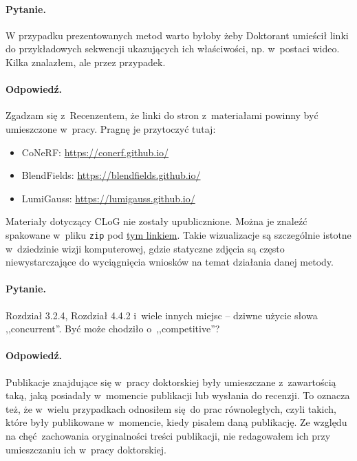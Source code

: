 \documentclass{rebuttal}
\begin{document}
  \responsedelimiter

\paragraph{Pytanie.}
  W przypadku prezentowanych metod warto byłoby żeby Doktorant umieścił linki do
  przykładowych sekwencji ukazujących ich właściwości, np. w~postaci wideo.
  Kilka znalazłem, ale przez przypadek.
\paragraph{Odpowiedź.}
  Zgadzam się z~Recenzentem, że linki do stron z~materiałami powinny być
  umieszczone w~pracy. Pragnę je przytoczyć tutaj:
  \begin{itemize}
    \item CoNeRF: \url{https://conerf.github.io/}
    \item BlendFields: \url{https://blendfields.github.io/}
    \item LumiGauss: \url{https://lumigauss.github.io/}
  \end{itemize}
  Materiały dotyczący CLoG nie zostały upublicznione.
  Można je znaleźć spakowane w~pliku \texttt{zip} pod
  \href{https://drive.google.com/file/d/1ViaYDDo-x5DjfMBDzO1bjK4UDX1qEomv/view?
    usp=sharing}{tym linkiem}.  Takie wizualizacje są szczególnie istotne w~dziedzinie wizji komputerowej, gdzie statyczne zdjęcia są często niewystarczające do wyciągnięcia wniosków na temat działania danej metody.

  \responsedelimiter

\paragraph{Pytanie.}
  Rozdział 3.2.4, Rozdział 4.4.2 i~wiele innych miejsc -- dziwne użycie słowa
  ,,concurrent''. Być może chodziło o~,,competitive''?
\paragraph{Odpowiedź.}
  Publikacje znajdujące się w~pracy doktorskiej były umieszczane z~zawartością
  taką, jaką posiadały w~momencie publikacji lub wysłania do recenzji. To
  oznacza też, że w~wielu przypadkach odnosiłem się do prac równoległych, czyli
  takich, które były publikowane w~momencie, kiedy pisałem daną publikację. Ze
  względu na chęć zachowania oryginalności treści publikacji, nie redagowałem
  ich przy umieszczaniu ich w~pracy doktorskiej.
\end{document}
